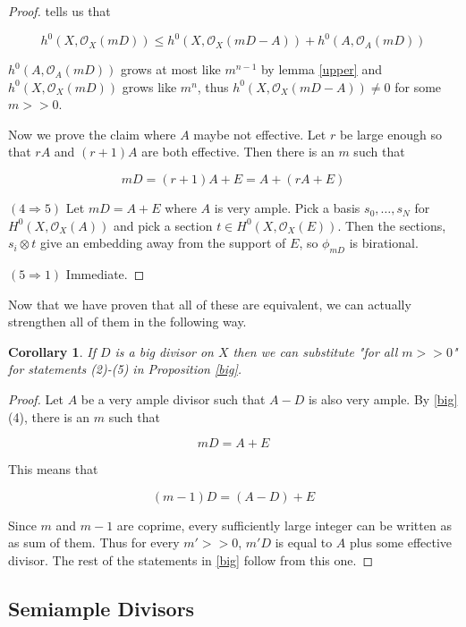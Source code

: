 \documentclass[a4paper]{article}
\newtheorem{corollary}[theorem]{Corollary}
\numberwithin{theorem}{section}
\begin{document}
\begin{proof}
tells us that

$$ h^0(X,\mathcal{O}_X(mD)) \leq h^0(X,\mathcal{O}_X(mD - A)) + h^0(A,\mathcal{O}_A(mD)) $$

$h^0(A,\mathcal{O}_A(mD))$ grows at most like $m^{n-1}$ by lemma \ref{upper} and $h^0(X,\mathcal{O}_X(mD))$ grows like $m^n$, thus $h^0(X,\mathcal{O}_X(mD - A)) \neq 0$ for some $m >> 0$.

Now we prove the claim where $A$ maybe not effective. Let $r$ be large enough so that $rA$ and $(r+1) A$ are both effective. Then there is an $m$ such that 

$$ mD = (r+1)A + E = A + (rA + E) $$

$(4 \Rightarrow 5)$ Let $mD = A + E$ where $A$ is very ample. Pick a basis $s_0,\dots,s_N$ for $H^0(X,\mathcal{O}_X(A))$ and pick a section $t \in H^0(X,\mathcal{O}_X(E))$. Then the sections, $s_i \otimes t$ give an embedding away from the support of $E$, so $\phi_{mD}$ is birational.

$(5 \Rightarrow 1)$ Immediate.

\end{proof}

Now that we have proven that all of these are equivalent, we can actually strengthen all of them in the following way.

\begin{corollary}
If $D$ is a big divisor on $X$ then we can substitute "for all $m >> 0$" for statements (2)-(5) in Proposition \ref{big}.
\end{corollary}

\begin{proof}
Let $A$ be a very ample divisor such that $A-D$ is also very ample. By \ref{big} (4), there is an $m$ such that

$$ mD = A + E $$

This means that

$$ (m-1)D = (A-D) + E $$

Since $m$ and $m-1$ are coprime, every sufficiently large integer can be written as as sum of them. Thus for every $m' >> 0$, $m'D$ is equal to $A$ plus some effective divisor. The rest of the statements in \ref{big} follow from this one.

\end{proof}

\subsection{Semiample Divisors}
\end{document}
